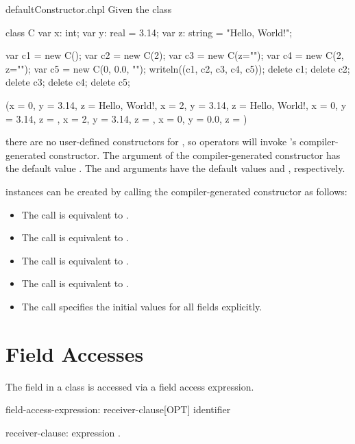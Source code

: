 \begin{chapelexample}{defaultConstructor.chpl}
Given the class
\begin{chapel}
class C {
  var x: int;
  var y: real = 3.14;
  var z: string = "Hello, World!";
}
\end{chapel}
\begin{chapelpost}
var c1 = new C();
var c2 = new C(2);
var c3 = new C(z="");
var c4 = new C(2, z="");
var c5 = new C(0, 0.0, "");
writeln((c1, c2, c3, c4, c5));
delete c1;
delete c2;
delete c3;
delete c4;
delete c5;
\end{chapelpost}
\begin{chapeloutput}
({x = 0, y = 3.14, z = Hello, World!}, {x = 2, y = 3.14, z = Hello, World!}, {x = 0, y = 3.14, z = }, {x = 2, y = 3.14, z = }, {x = 0, y = 0.0, z = })
\end{chapeloutput}
there are no user-defined constructors for , so  operators
will invoke 's compiler-generated constructor. The  argument
of the compiler-generated constructor has the default value .
The  and  arguments have the default values  and
, respectively.

 instances can be created by calling the compiler-generated constructor as follows:
\begin{itemize}
\item The call  is equivalent to .
\item The call  is equivalent to .
\item The call  is equivalent to .
\item The call  is equivalent to .
\item The call  specifies the initial values for all fields explicitly.
\end{itemize}
\end{chapelexample}

\section{Field Accesses}
\label{Class_Field_Accesses}

The field in a class is accessed via a field access expression.

\begin{syntax}
field-access-expression:
  receiver-clause[OPT] identifier

receiver-clause:
  expression .
\end{syntax}

